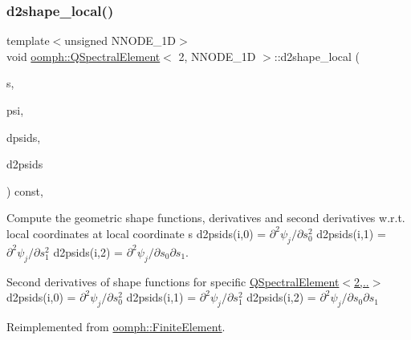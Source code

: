 \mbox{\label{classoomph_1_1QSpectralElement_3_012_00_01NNODE__1D_01_4_aaf4f353bb9b3ff1f475b4940c8f0c5d6}} 
\subsubsection{\texorpdfstring{d2shape\+\_\+local()}{d2shape\_local()}}
{\footnotesize\ttfamily template$<$unsigned N\+N\+O\+D\+E\+\_\+1D$>$ \\
void \hyperlink{classoomph_1_1QSpectralElement}{oomph\+::\+Q\+Spectral\+Element}$<$ 2, N\+N\+O\+D\+E\+\_\+1D $>$\+::d2shape\+\_\+local (\begin{DoxyParamCaption}\item[{const \hyperlink{classoomph_1_1Vector}{Vector}$<$ double $>$ \&}]{s,  }\item[{\hyperlink{classoomph_1_1Shape}{Shape} \&}]{psi,  }\item[{\hyperlink{classoomph_1_1DShape}{D\+Shape} \&}]{dpsids,  }\item[{\hyperlink{classoomph_1_1DShape}{D\+Shape} \&}]{d2psids }\end{DoxyParamCaption}) const\hspace{0.3cm}{\ttfamily [inline]}, {\ttfamily [virtual]}}



Compute the geometric shape functions, derivatives and second derivatives w.\+r.\+t. local coordinates at local coordinate s d2psids(i,0) = $ \partial ^2 \psi_j / \partial s_0^2 $ d2psids(i,1) = $ \partial ^2 \psi_j / \partial s_1^2 $ d2psids(i,2) = $ \partial ^2 \psi_j / \partial s_0 \partial s_1 $. 

Second derivatives of shape functions for specific \hyperlink{classoomph_1_1QSpectralElement_3_012_00_01NNODE__1D_01_4_a950e01a426602b45c67c19fdf0693583}{Q\+Spectral\+Element$<$2,..$>$} d2psids(i,0) = $ \partial ^2 \psi_j / \partial s_0^2 $ d2psids(i,1) = $ \partial ^2 \psi_j / \partial s_1^2 $ d2psids(i,2) = $ \partial ^2 \psi_j / \partial s_0 \partial s_1 $ 

Reimplemented from \hyperlink{classoomph_1_1FiniteElement_a53e5051582d9da07b9d35da9debd0cd7}{oomph\+::\+Finite\+Element}.



